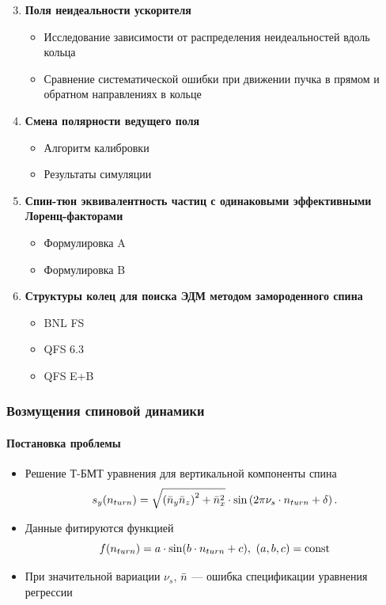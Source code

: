 \documentclass[14pt]{beamer}
\newcommand{\ntrn}{n_{turn}}
\begin{document}
\begin{frame}
	\begin{enumerate}	\setcounter{enumi}{2}
		\item \textbf{Поля неидеальности ускорителя}
		\begin{itemize}
			\item Исследование зависимости от распределения неидеальностей вдоль кольца
			\item Сравнение систематической ошибки при движении пучка в прямом и обратном направлениях в кольце
		\end{itemize}
		\item \textbf{Смена полярности ведущего поля}
		\begin{itemize}
			\item Алгоритм калибровки
			\item Результаты симуляции
		\end{itemize}
	\end{enumerate}
\end{frame}
\begin{frame} %
	\begin{enumerate}  \setcounter{enumi}{4}
		\item \textbf{Спин-тюн эквивалентность частиц с одинаковыми эффективными Лоренц-факторами}
		\begin{itemize}
			\item Формулировка A
			\item Формулировка B
		\end{itemize}
		\item \textbf{Структуры колец для поиска ЭДМ методом замороденного спина}
		\begin{itemize}
			\item BNL FS
			\item QFS 6.3
			\item QFS E+B
		\end{itemize}
	\end{enumerate}
\end{frame}
\begin{frame}\frametitle{Возмущения спиновой динамики}
	\framesubtitle{Постановка проблемы}
	\begin{itemize}
		\item Решение Т-БМТ уравнения для вертикальной компоненты спина
		\[
		s_y(n_{turn}) = \sqrt{\bkt{\nbar_y\nbar_z}^2 + \nbar_x^2}\cdot\sin\bkt{2\pi\nu_s\cdot\ntrn + \delta}.
		\]
		\item Данные фитируются функцией
		\[
		f(\ntrn) = a\cdot \sin(b\cdot \ntrn + c), ~(a,b,c)=\const
		\]
		\item При значительной вариации $\nu_s$, $\bar n$ --- ошибка спецификации уравнения регрессии
	\end{itemize}
\end{frame}
\end{document}
